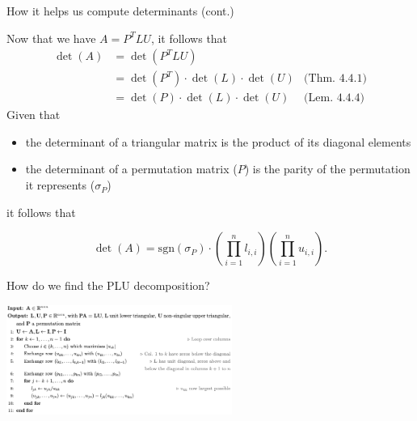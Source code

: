 \documentclass{beamer}
\begin{document}
\begin{frame}{How it helps us compute determinants (cont.)}

    Now that we have $A=P^T LU$, it follows that
    \begin{align*}
        \det(A)  & = \det(P^T L U) & \\
                 & = \det(P^T)\cdot \det(L)\cdot \det(U) & \text{(Thm. 4.4.1)} \\
                 & = \det(P)\cdot \det(L)\cdot \det(U)   & \text{(Lem. 4.4.4)}
    \end{align*}
    Given that
    \begin{itemize}
        \item the determinant of a triangular matrix is the product of its diagonal elements
        \item the determinant of a permutation matrix ($P$) is the parity of the permutation
            it represents ($\sigma_P$)
    \end{itemize}
    it follows that
    \begin{block}{}
        \[
            \det(A) = \text{sgn}(\sigma_P) \cdot \left( \prod_{i=1}^{n} l_{i,i} \right)
            \left( \prod_{i=1}^{n} u_{i,i} \right).
        \]
    \end{block}

\end{frame}

\begin{frame}{How do we find the PLU decomposition?}

    \begin{center}{}
        \includegraphics[height=135]{PLUcode.png}
    \end{center}

\end{frame}
\end{document}
